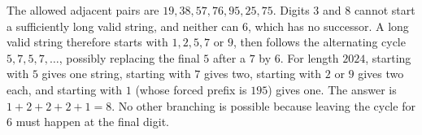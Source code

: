 The allowed adjacent pairs are $19,38,57,76,95,25,75$. Digits $3$ and $8$ cannot start a sufficiently long valid string, and neither can $6$, which has no successor. A long valid string therefore starts with $1,2,5,7$ or $9$, then follows the alternating cycle $5,7,5,7,\ldots$, possibly replacing the final $5$ after a $7$ by $6$.
For length $2024$, starting with $5$ gives one string, starting with $7$ gives two, starting with $2$ or $9$ gives two each, and starting with $1$ (whose forced prefix is $195$) gives one. The answer is $\boxed{1+2+2+2+1=8}$. No other branching is possible because leaving the cycle for $6$ must happen at the final digit.
